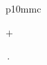 \documentclass[11pt,a4paper]{article}
\begin{document}
\begin{tabular}{p{10mm}c}
{\begin{minipage}[h]{0.2\linewidth}
\end{minipage}
$+$
\begin{minipage}[h]{0.2\linewidth}
\end{minipage}
$\,.$
}
\end{tabular}
\end{document}
